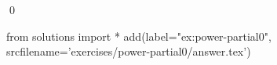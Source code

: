 
\begin{ex} 
  \label{ex:power-partial0}
  
  \qed
\end{ex} 
\begin{python0}
from solutions import *
add(label="ex:power-partial0",
    srcfilename='exercises/power-partial0/answer.tex') 
\end{python0}
